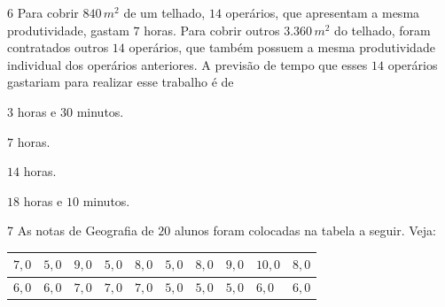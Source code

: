 \num{6}  Para cobrir $840\,m^2$ de um telhado, $14$ operários, que apresentam a
mesma produtividade, gastam $7$ horas. Para cobrir outros $3.360\,m^2$ do
telhado, foram contratados outros $14$ operários, que também possuem a
mesma produtividade individual dos operários anteriores. A previsão de
tempo que esses $14$ operários gastariam para realizar esse trabalho é de

\begin{escolha}
\item $3$ horas e $30$ minutos.
\item $7$ horas.
\item $14$ horas.
\item $18$ horas e $10$ minutos.
\end{escolha}




\num{7}  As notas de Geografia de $20$ alunos foram colocadas na tabela a seguir. Veja:

\begin{longtable}[]{@{}llllllllll@{}}
\toprule
$7,0$ & $5,0$ & $9,0$ & $5,0$ & $8,0$ & $5,0$ & $8,0$ & $9,0$ & $10,0$ &
$8,0$\tabularnewline
\midrule
\endhead
$6,0$ & $6,0$ & $7,0$ & $7,0$ & $7,0$ & $5,0$ & $5,0$ & $5,0$ & $6,0$ & $6,0$\tabularnewline
\bottomrule
\end{longtable}

